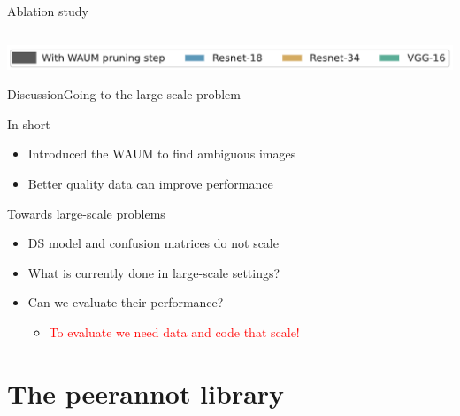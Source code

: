 \begin{frame}{Ablation study}{}
\begin{columns}
        \end{columns}
    \centering
    \includegraphics[width=.75\textwidth]{../chapters/images/legend_ablation_study.pdf}
\end{frame}

\begin{frame}{Discussion}{Going to the large-scale problem}
\begin{block}{In short}
\begin{itemize}
    \item Introduced the WAUM to find ambiguous images
    \item Better quality data can improve performance
\end{itemize}
\end{block}

\pause
\begin{block}{Towards large-scale problems}
\begin{itemize}
    \item DS model and confusion matrices do not scale
    \item What is currently done in large-scale settings?
    \item Can we evaluate their performance?
    \begin{itemize}
    \item<3> \textcolor{red}{To evaluate we need data and code that scale!}
    \end{itemize}
\end{itemize}
\end{block}
\end{frame}

\section{The peerannot library}

